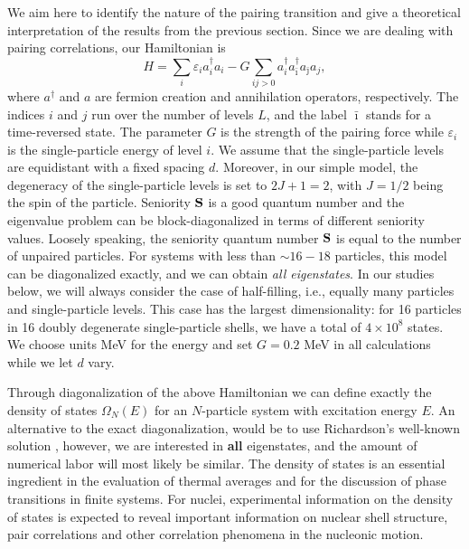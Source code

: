 \documentclass{elsart}
\begin{document}
We aim here to identify the nature of the pairing
transition and give a theoretical interpretation of the results 
from the previous section.
Since we are dealing with pairing correlations, our 
Hamiltonian is 
\begin{equation}
   H=\sum_i \varepsilon_i a^{\dagger}_i a_i -G\sum_{ij>0}
           a^{\dagger}_{i}
     a^{\dagger}_{\bar{\imath}}a_{\bar{\jmath}}a_{j},
     \label{eq:pairHamiltonian}
\end{equation}
where $a^{\dagger}$ and $a$ are fermion creation and annihilation operators, 
respectively. The indices $i$ and $j$ run over the number 
of levels $L$, and the label $\bar{\imath}$ stands for a time-reversed state. 
The parameter $G$ is the strength of the pairing 
force while $\varepsilon_i$ is 
the single-particle energy of level $i$. 
We assume that the single-particle levels are equidistant with a 
fixed spacing $d$.
Moreover, in our simple model, the degeneracy of the single-particle 
levels is set to $2J+1=2$, with $J=1/2$ being the spin of the particle. 
Seniority $\bf{S}$ 
is a good quantum number and the eigenvalue problem 
can be block-diagonalized
in terms of different seniority values. Loosely speaking, 
the seniority quantum number $\bf{S}$ is equal to the number of 
unpaired particles.
For systems with less than $\sim 16-18$ particles, 
this model can be diagonalized
exactly, and we can obtain {\em all eigenstates}. 
In our studies below, we will always
consider the case of half-filling, i.e., equally many particles
and single-particle levels. This case has the largest dimensionality: for 
16 particles in 16 doubly degenerate single-particle shells, we have a
total of $4\times 10^8$ states. We choose units MeV for the energy and 
set $G=0.2$ MeV in all calculations while we let $d$ vary. 

Through diagonalization 
of the above Hamiltonian
we can define exactly the
density of states $\Omega_N(E)$ for an $N$-particle
system with excitation energy $E$. 
An alternative 
to the exact diagonalization, would be 
to  use Richardson's well-known 
solution \cite{richardson}, 
however, we are interested in {\bf all} eigenstates,
and the amount of numerical labor will most likely be similar.
The density of states is
an essential ingredient in the
evaluation of thermal averages and for the discussion of phase
transitions in finite systems. For nuclei, experimental 
information on the density of states
is expected to reveal important information on nuclear shell
structure, pair correlations and other correlation phenomena
in the nucleonic motion. 
\end{document}
